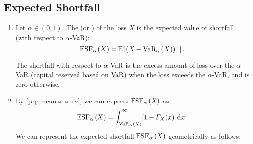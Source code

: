 \subsection{Expected Shortfall}
\begin{enumerate}
\item Let \(\alpha\in(0,1)\). The  (or ) of the loss \(X\) is the expected value
of shortfall (with respect to \(\alpha\)-VaR):
\[
\operatorname{ESF}_{\alpha}\left(X\right)=\mathbb{E}\left[(X-\operatorname{VaR}_{\alpha}\left(X\right))_{+}\right].
\]
\begin{note}
The shortfall with respect to \(\alpha\)-VaR is the excess amount of loss over
the \(\alpha\)-VaR (capital reserved based on VaR) when the loss exceeds the
\(\alpha\)-VaR, and is zero otherwise.
\end{note}

\item By \cref{prp:mean-sl-surv}, we can express \(\operatorname{ESF}_{\alpha}\left(X\right)\) as:
\[
\operatorname{ESF}_{\alpha}\left(X\right)=\int_{\operatorname{VaR}_{\alpha}\left(X\right)}^{\infty}[1-F_X(x)]\dd{x}.
\]
We can represent the expected shortfall \(\operatorname{ESF}_{\alpha}\left(X\right)\) geometrically as
follows:
\begin{center}
\end{center}
\end{enumerate}
